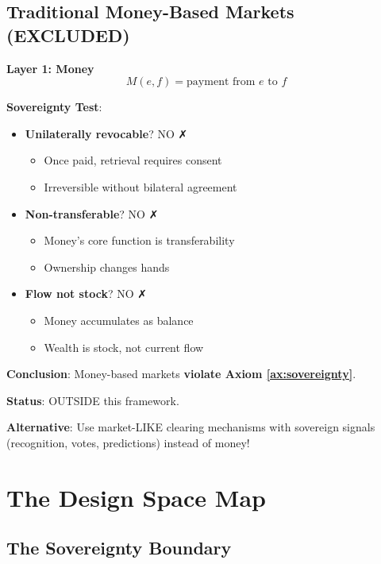 \documentclass[11pt,a4paper]{article}
\theoremstyle{definition}
\theoremstyle{remark}
\begin{document}
\subsection{Traditional Money-Based Markets (EXCLUDED)}

\textbf{Layer 1: Money}
\[ M(e,f) = \text{payment from } e \text{ to } f \]

\textbf{Sovereignty Test}:
\begin{itemize}
\item \textbf{Unilaterally revocable}? NO ✗
  \begin{itemize}
  \item Once paid, retrieval requires consent
  \item Irreversible without bilateral agreement
  \end{itemize}
\item \textbf{Non-transferable}? NO ✗
  \begin{itemize}
  \item Money's core function is transferability
  \item Ownership changes hands
  \end{itemize}
\item \textbf{Flow not stock}? NO ✗
  \begin{itemize}
  \item Money accumulates as balance
  \item Wealth is stock, not current flow
  \end{itemize}
\end{itemize}

\textbf{Conclusion}: Money-based markets \textbf{violate Axiom \ref{ax:sovereignty}}.

\textbf{Status}: OUTSIDE this framework.

\textbf{Alternative}: Use market-LIKE clearing mechanisms with sovereign signals (recognition, votes, predictions) instead of money!

\section{The Design Space Map}

\subsection{The Sovereignty Boundary}
\end{document}

